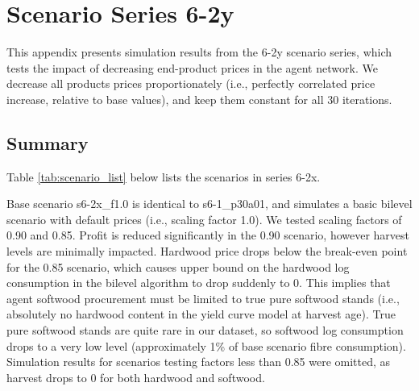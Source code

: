 \chapter{Scenario Series 6-2y}

This appendix presents simulation results from the 6-2y scenario series, which tests the impact of decreasing end-product prices in the agent network. 
We decrease all products prices proportionately (i.e., perfectly correlated price increase, relative to base values), and keep them constant for all 30 iterations. 

\section{Summary}
Table \ref{tab:scenario_list} below lists the scenarios in series 6-2x.
 
Base scenario s6-2x\_f1.0 is identical to s6-1\_p30a01, and simulates a basic bilevel scenario with default prices (i.e., scaling factor 1.0).
We tested scaling factors of 0.90 and 0.85. 
Profit is reduced significantly in the 0.90 scenario, however harvest levels are minimally impacted.
Hardwood price drops below the break-even point for the 0.85 scenario, which causes upper bound on the hardwood log consumption in the bilevel algorithm to drop suddenly to 0. 
This implies that agent softwood procurement must be limited to true pure softwood stands (i.e., absolutely no hardwood content in the yield curve model at harvest age). 
True pure softwood stands are quite rare in our dataset, so softwood log consumption drops to a very low level (approximately 1\% of base scenario fibre consumption).
Simulation results for scenarios testing factors less than 0.85 were omitted, as harvest drops to 0 for both hardwood and softwood.

